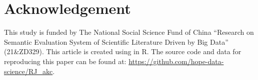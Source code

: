 \hypertarget{acknowledgement}{%
\section{Acknowledgement}\label{acknowledgement}}

This study is funded by The National Social Science Fund of China
``Research on Semantic Evaluation System of Scientific Literature Driven
by Big Data'' (21\&ZD329). This article is created using 
\citep{rjtools2022} in R. The source code and data for reproducing this
paper can be found at:
\url{https://github.com/hope-data-science/RJ_akc}.



\address{%
Tian-Yuan Huang\\
National Science Library, Chinese Academy of Sciences\\%
Beijing, China\\
%
%
\textit{ORCiD: \href{https://orcid.org/0000-0002-4151-3764}{0000-0002-4151-3764}}\\%
\href{mailto:huangtianyuan@mail.las.ac.cn}{\nolinkurl{huangtianyuan@mail.las.ac.cn}}%
}

\address{%
Li Li\\
National Science Library, Chinese Academy of Sciences\\%
Beijing, China\\
%
%
%
\href{mailto:lili2020@mail.las.ac.cn}{\nolinkurl{lili2020@mail.las.ac.cn}}%
}

\address{%
Liying Yang\\
National Science Library, Chinese Academy of Sciences\\%
Beijing, China\\
%
%
%
\href{mailto:yangly@mail.las.ac.cn}{\nolinkurl{yangly@mail.las.ac.cn}}%
}
